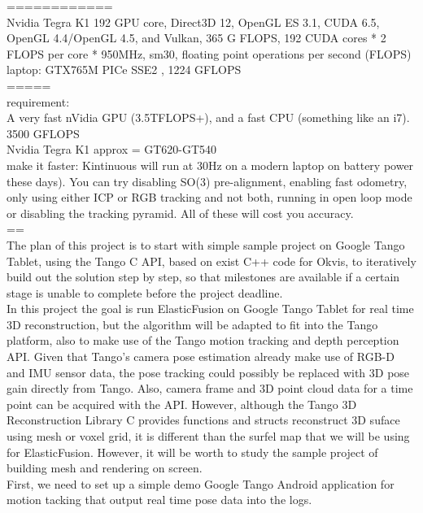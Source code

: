 \documentclass[12pt,twoside]{article}
\begin{document}
============\\


Nvidia Tegra K1  192  GPU core, Direct3D 12, OpenGL ES 3.1, CUDA 6.5, OpenGL 4.4/OpenGL 4.5, and Vulkan, 365 G FLOPS, 192 CUDA cores * 2 FLOPS per core * 950MHz, sm30, floating point operations per second (FLOPS)\\
laptop: GTX765M PICe SSE2 , 1224 GFLOPS\\
=====\\
requirement:\\
A very fast nVidia GPU (3.5TFLOPS+), and a fast CPU (something like an i7).  3500 GFLOPS\\
Nvidia Tegra K1  approx = GT620-GT540\\
make it faster: Kintinuous will run at 30Hz on a modern laptop on battery power these days). You can try disabling SO(3) pre-alignment, enabling fast odometry, only using either ICP or RGB tracking and not both, running in open loop mode or disabling the tracking pyramid. All of these will cost you accuracy.\\
==\\
The plan of this project is to start with simple sample project on Google Tango Tablet, using the Tango C API, based on exist C++ code for Okvis\cite{leutenegger2015keyframe}, to iteratively build out the solution step by step, so that milestones are available if a certain stage is unable to complete before the project deadline.\\
In this project the goal is run ElasticFusion\citep{whelan2016elasticfusion} on Google Tango Tablet for real time 3D reconstruction, but the algorithm will be adapted to fit into the Tango platform, also to make use of the Tango motion tracking and depth perception API. Given that Tango's camera pose estimation already make use of RGB-D and IMU sensor data, the pose tracking could possibly be replaced with 3D pose gain directly from Tango. Also, camera frame and 3D point cloud data for a time point can be acquired with the API. However, although the Tango 3D Reconstruction Library C provides functions and structs reconstruct 3D suface using mesh or voxel grid, it is different than the surfel map that we will be using for ElasticFusion\citep{whelan2016elasticfusion}. However, it will be worth to study the sample project of building mesh and rendering on screen.\\
First, we need to set up a simple demo Google Tango Android application for motion tacking that output real time pose data into the logs.\\
\end{document}

